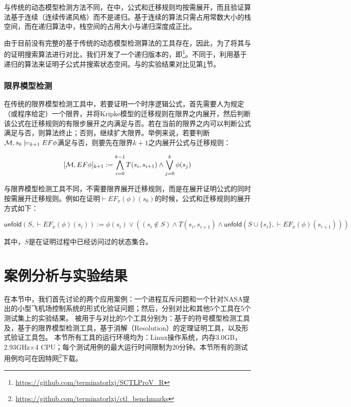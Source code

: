与传统的\CTL{}动态模型检测方法不同，在\sctlprov{}中，公式和迁移规则均按需展开，而且验证算法基于连续（连续传递风格）而不是递归。基于连续的算法只需占用常数大小的栈空间\cite{Reynolds93,Appel06,Sestoft12}，而在递归算法中，栈空间的占用大小与递归深度成正比。

由于目前没有完整的基于传统的动态模型检测算法的工具存在，因此，为了将其与\sctlprov{}的证明搜索算法进行对比，我们开发了一个递归版本的\sctlprov{}，即\sctlprovr{}\footnote{\url{https://github.com/terminatorlxj/SCTLProV_R}}。不同于\sctlprov{}，\sctlprovr{}利用基于递归的算法来证明子公式并搜索状态空间。\sctlprov{}与\sctlprovr{}的实验结果对比见第\ref{sec:case_exp}节。

\subsubsection{限界模型检测}
在传统的限界模型检测工具中，若要证明一个时序逻辑公式，首先需要人为规定（或程序给定）一个限界，并将Kripke模型的迁移规则在限界之内展开，然后判断该公式在迁移规则的有限步展开之内满足与否。若在当前的限界之内可以判断公式满足与否，则算法终止；否则，继续扩大限界。举例来说，若要判断${\cal M}, s_0 \models_{k+1} EF\phi$满足与否，则要先在限界$k+1$之内展开公式与迁移规则\cite{BCCZ99}：

\begin{small}
	$$ [{\cal M},EF\phi]_{k+1} := \bigwedge^{k-1}_{i=0}T(s_i,s_{i+1}) \wedge \bigvee_{j=0}^k\phi(s_j)$$
\end{small}

与限界模型检测工具不同，\sctlprov{}不需要限界展开迁移规则，而是在展开证明公式的同时按需展开迁移规则。例如在证明$\vdash EF_x(\phi)(s_0)$的时候，公式和迁移规则的展开方式如下：

\begin{center}{\small
		$
		\textsf{unfold}(S,\vdash EF_x(\phi)(s_i)) := 
		\phi(s_i) \vee ((s_i\notin S) \wedge T(s_i, s_{i+1}) \wedge 
		\textsf{unfold}(S\cup \{s_i\},\vdash EF_x(\phi)(s_{i+1})))
		$
	}
\end{center}
其中，$S$是在证明过程中已经访问过的状态集合。


\section{案例分析与实验结果}\label{sec:case_exp}

在本节中，我们首先讨论\sctlprov{}的两个应用案例：一个进程互斥问题和一个针对NASA提出的小型飞机场控制系统的形式化验证问题；然后，分别对比\sctlprov{}和其他5个工具在5个测试集上的实验结果。
被用于与\sctlprov{}对比的5个工具分别为：基于\BDD{}的符号模型检测工具\nusmv{}及\nuxmv，基于\QBF{}的限界模型检测工具\verds{}，基于消解（Resolution）的定理证明工具，以及形式验证工具包\CADP{}。
本节所有工具的运行环境均为：Linux操作系统，内存3.0GB，2.93GHz$\times$4 CPU；每个测试用例的最大运行时间限制为20分钟。本节所有的测试用例均可在因特网\footnote{\url{https://github.com/terminatorlxj/ctl_benchmarks}}下载。



